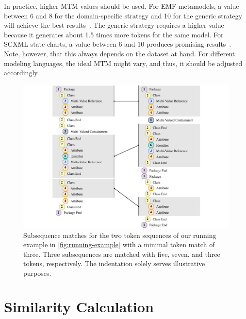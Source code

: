 In practice, higher MTM values should be used. For \ac{EMF} metamodels, a value between 6 and 8 for the domain-specific strategy and 10 for the generic strategy will achieve the best results~\cite{Saglam2022, Saglam2024a}.
The generic strategy requires a higher value because it generates about 1.5 times more tokens for the same model.
For \ac{SCXML} state charts, a value between 6 and 10 produces promising results~\cite{Strittmatter2023}.
Note, however, that this always depends on the dataset at hand. For different modeling languages, the ideal MTM might vary, and thus, it should be adjusted accordingly.

\begin{figure}
    \centering
    \includegraphics[width=\linewidth]{figures/mde/tokenMatching.pdf}
    \caption[Subsequence Matching for Modeling Artifacts]{Subsequence matches for the two token sequences of our running example in \autoref{fig:running-example} with a minimal token match of three. Three subsequences are matched with five, seven, and three tokens, respectively. The indentation solely serves illustrative purposes.}
    \label{fig:comparison}
\end{figure}


\section{Similarity Calculation}\label{subsec:similarity}

